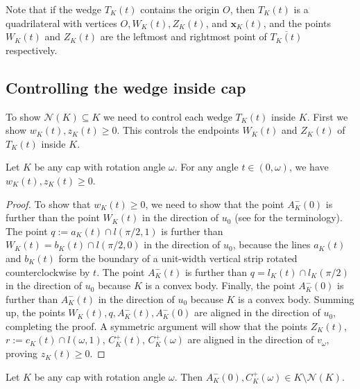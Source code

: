 Note that if the wedge \(T_K(t)\) contains the origin \(O\), then \(T_K(t)\) is a quadrilateral with vertices \(O, W_K(t), Z_K(t)\), and \(\mathbf{x}_K(t)\), and the points \(W_K(t)\) and \(Z_K(t)\) are the leftmost and rightmost point of \(\overline{T_K(t)}\) respectively.

\subsection{Controlling the wedge inside cap}

To show \(\mathcal{N}(K) \subseteq K\) we need to control each wedge \(T_K(t)\) inside \(K\). First we show \(w_K(t), z_K(t) \geq 0\). This controls the endpoints \(W_K(t)\) and \(Z_K(t)\) of \(T_K(t)\) inside \(K\).

\begin{lemma}

Let \(K\) be any cap with rotation angle \(\omega\). For any angle \(t \in (0, \omega)\), we have \(w_K(t), z_K(t) \geq 0\).

\label{lem:wedge-ends-in-cap}
\end{lemma}

\begin{proof}
To show that \(w_K(t) \geq 0\), we need to show that the point \(A_K^-(0)\) is further than the point \(W_K(t)\) in the direction of \(u_0\) (see  for the terminology). The point \(q := a_K(t) \cap l(\pi/2, 1)\) is further than \(W_K(t) = b_K(t) \cap l(\pi/2, 0)\) in the direction of \(u_0\), because the lines \(a_K(t)\) and \(b_K(t)\) form the boundary of a unit-width vertical strip rotated counterclockwise by \(t\). The point \(A^-_K(t)\) is further than \(q = l_K(t) \cap l_K(\pi/2)\) in the direction of \(u_0\) because \(K\) is a convex body. Finally, the point \(A^-_K(0)\) is further than \(A_K^-(t)\) in the direction of \(u_0\) because \(K\) is a convex body. Summing up, the points \(W_K(t), q, A_K^-(t), A_K^-(0)\) are aligned in the direction of \(u_0\), completing the proof. A symmetric argument will show that the points \(Z_K(t)\), \(r := c_K(t) \cap l(\omega, 1)\), \(C_K^+(t)\), \(C_K^+(\omega)\) are aligned in the direction of \(v_\omega\), proving \(z_K(t) \geq 0\).
\end{proof}

\begin{corollary}

Let \(K\) be any cap with rotation angle \(\omega\). Then \(A^-_K(0), C^+_K(\omega) \in K \setminus \mathcal{N}(K)\).

\label{cor:cap-ends-not-in-niche}
\end{corollary}

